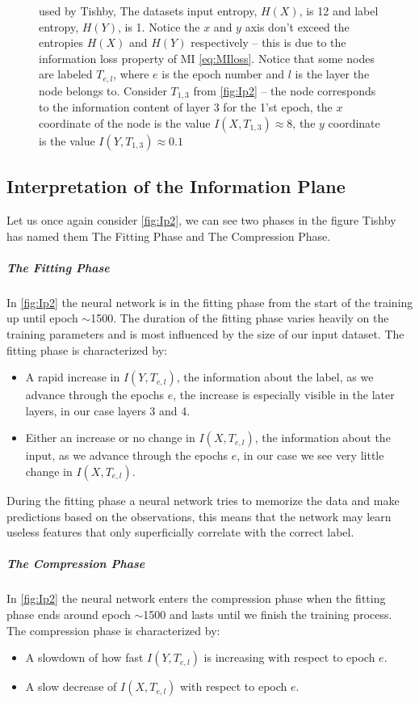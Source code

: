 \documentclass[dissertation.tex]{subfiles}
\begin{document}
\begin{figure}[H]
{    used by Tishby\cite{TISHBY}, The datasets input entropy, $H(X)$, is 12 and
    label entropy, $H(Y)$, is 1. Notice the $x$ and $y$ axis don't exceed the
    entropies $H(X)$ and $H(Y)$ respectively -- this is due to the information
    loss property of MI \autoref{eq:MIloss}.
    Notice that some nodes are labeled $T_{e,l}$, where $e$ is the epoch number
    and $l$ is the layer the node belongs to. Consider $T_{1,3}$ from
    \autoref{fig:Ip2} -- the node corresponds to the information content of
    layer 3 for the 1'st epoch, the $x$ coordinate of the node is the value
    $I(X, T_{1,3})\approx{8}$, the $y$ coordinate is the value $I(Y,
    T_{1,3})\approx{0.1}$
  }
\end{figure}

\subsection{Interpretation of the Information Plane}

Let us once again consider \autoref{fig:Ip2}, we can see two phases in the figure
Tishby has named them The Fitting Phase and The Compression Phase.

\subparagraph{The Fitting Phase} In \autoref{fig:Ip2} the neural network is in
the fitting phase from the start of the training up until epoch $\sim$1500. The
duration of the fitting phase varies heavily on the training parameters and is
most influenced by the size of our input dataset. The fitting phase is
characterized by:
\begin{itemize}
  \item{
      A rapid increase in $I(Y, T_{e,l})$, the information about the label, as we
      advance through the epochs $e$, the increase is especially visible in the
      later layers, in our case layers 3 and 4.
    }
  \item{
      Either an increase or no change in $I(X, T_{e,l})$, the information about
      the input, as we advance through the epochs $e$, in our case we see very
      little change in $I(X,T_{e,l})$.
    }
\end{itemize}

During the fitting phase a neural network tries to memorize the data and make
predictions based on the observations, this means that the network may learn
useless features that only superficially correlate with the correct label.

\subparagraph{The Compression Phase} In \autoref{fig:Ip2} the neural network
enters the compression phase when the fitting phase ends around epoch $\sim$1500
and lasts until we finish the training process. The compression phase is
characterized by:
\begin{itemize}
  \item{
      A slowdown of how fast $I(Y, T_{e,l})$ is increasing with respect to epoch
      $e$. 
    }
  \item{
      A slow decrease of $I(X, T_{e,l})$ with respect to epoch $e$.
    }
\end{itemize}
\end{document}
